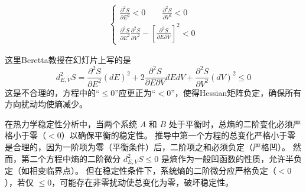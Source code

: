 \begin{thm}
\begin{enumerate}
\begin{itemize}
\begin{align*}
            \begin{cases} 
            \frac{\partial^2 S}{\partial E^2} < 0 \qquad \frac{\partial^2 S}{\partial V^2} < 0 \\ 
            \frac{\partial^2 S}{\partial E^2} \frac{\partial^2 S}{\partial V^2} - \left[ \frac{\partial^2 S}{\partial E \partial V} \right]^2 < 0 
            \end{cases}
\end{align*}
\begin{zhu}
    这里Beretta教授在幻灯片上写的是
    \[
        d_{E,V}^2 S = \frac{\partial^2 S}{\partial E^2} (dE)^2 + 2 \frac{\partial^2 S}{\partial E \partial V} dEdV + \frac{\partial^2 S}{\partial V^2} (dV)^2 \boxed{\leq} 0
    \]
    这是不合理的，方程中的“$\leq0$”应更正为“$<0$”，使得Hessian矩阵负定，确保所有方向扰动均使熵减少。

    在热力学稳定性分析中，当两个系统 \( A \) 和 \( B \) 处于平衡时，总熵的二阶变化必须严格小于零（\(<0\)）以确保平衡的稳定性。
    推导中第一个方程的总变化严格小于零是合理的，因为一阶项为零（平衡条件）后，二阶项之和必须负定（严格凹）。
    然而，第二个方程中熵的二阶微分 \( d^2_{E,V} S \leq 0 \) 是熵作为一般凹函数的性质，允许半负定（如相变临界点）。
    但在稳定性条件下，系统熵的二阶微分应严格负定（\(<0\)），若仅 \( \leq 0 \)，可能存在非零扰动使总变化为零，破坏稳定性。
    

\end{zhu}
\end{itemize}
\end{enumerate}
\end{thm}
